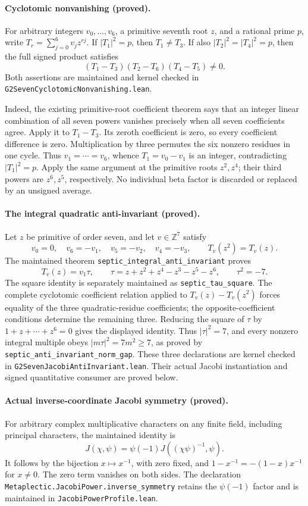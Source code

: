 \documentclass[11pt]{article}
\begin{document}
\paragraph{Cyclotomic nonvanishing (proved).}
For arbitrary integers \(v_0,\ldots,v_6\), a primitive seventh root
\(z\), and a rational prime \(p\), write
\(T_r=\sum_{j=0}^6v_jz^{rj}\).
If \(|T_1|^2=p\), then \(T_1\ne T_3\). If also
\(|T_2|^2=|T_4|^2=p\), then the full signed product satisfies
\[
 (T_1-T_3)(T_2-T_6)(T_4-T_5)\ne0.
\]
Both assertions are maintained and kernel checked in
\texttt{G2SevenCyclotomicNonvanishing.lean}.

Indeed, the existing primitive-root coefficient theorem says that an
integer linear combination of all seven powers vanishes precisely
when all seven coefficients agree. Apply it to \(T_1-T_3\).
Its zeroth coefficient is zero, so every coefficient difference is
zero. Multiplication by three permutes the six nonzero residues
in one cycle. Thus \(v_1=\cdots=v_6\), whence
\(T_1=v_0-v_1\) is an integer, contradicting \(|T_1|^2=p\).
Apply the same argument at the primitive roots \(z^2,z^4\);
their third powers are \(z^6,z^5\), respectively. No individual
beta factor is discarded or replaced by an unsigned average.

\paragraph{The integral quadratic anti-invariant (proved).}
Let \(z\) be primitive of order seven, and let \(v\in\mathbb Z^7\)
satisfy
\[
 v_0=0,\quad v_6=-v_1,\quad v_5=-v_2,\quad v_4=-v_3,
 \qquad T_v(z^2)=T_v(z).
\]
The maintained theorem \texttt{septic\_integral\_anti\_invariant}
proves
\[
 T_v(z)=v_1\tau,\qquad
 \tau=z+z^2+z^4-z^3-z^5-z^6,\qquad \tau^2=-7.
\]
The square identity is separately maintained as
\texttt{septic\_tau\_square}. The complete cyclotomic coefficient
relation applied to \(T_v(z)-T_v(z^2)\) forces equality of the
three quadratic-residue coefficients; the opposite-coefficient
conditions determine the remaining three. Reducing the square of
\(\tau\) by \(1+z+\cdots+z^6=0\) gives the displayed identity.
Thus \(|\tau|^2=7\), and every nonzero integral multiple obeys
\(|m\tau|^2=7m^2\ge7\), as proved by
\texttt{septic\_anti\_invariant\_norm\_gap}.
These three declarations are kernel checked in
\texttt{G2SevenJacobiAntiInvariant.lean}. Their actual Jacobi
instantiation and signed quantitative consumer are proved below.

\paragraph{Actual inverse-coordinate Jacobi symmetry (proved).}
For arbitrary complex multiplicative characters on any finite field,
including principal characters, the maintained identity is
\[
 J(\chi,\psi)=\psi(-1)J((\chi\psi)^{-1},\psi).
\]
It follows by the bijection \(x\mapsto x^{-1}\), with zero fixed,
and \(1-x^{-1}=-(1-x)x^{-1}\) for \(x\ne0\).
The zero term vanishes on both sides. The declaration
\texttt{Metaplectic.JacobiPower.inverse\_symmetry} retains
the \(\psi(-1)\) factor and is maintained in
\texttt{JacobiPowerProfile.lean}.
\end{document}
